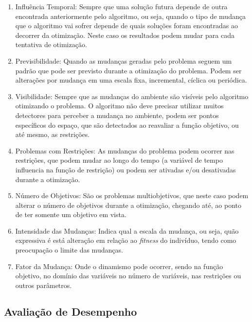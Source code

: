 \begin{enumerate}
	\item Influência Temporal: Sempre que uma solução futura depende de outra encontrada anteriormente pelo algoritmo, ou seja, quando o tipo de mudança que o algoritmo vai sofrer depende de quais soluções foram encontradas ao decorrer da otimização. Neste caso os resultados podem mudar para cada tentativa de otimização.
	
	\item Previsibilidade: Quando as mudanças geradas pelo problema seguem um padrão que pode ser previsto durante a otimização do problema. Podem ser alterações por mudança em uma escala fixa, incremental, cíclica ou periódica.
	
	\item Visibilidade: Sempre que as mudanças do ambiente são visíveis pelo algoritmo otimizando o problema. O algoritmo não deve precisar utilizar muitos detectores para perceber a mudança no ambiente, podem ser pontos específicos do espaço, que são detectados ao reavaliar a função objetivo, ou até mesmo, as restrições.
	
	\item Problemas com Restrições: As mudanças do problema podem ocorrer nas restrições, que podem mudar ao longo do tempo (a variável de tempo influencia na função de restrição) ou podem ser ativadas e/ou desativadas durante a otimização.
	
	\item Número de Objetivos: São os problemas multiobjetivos, que neste caso podem alterar o número de objetivos durante a otimização, chegando até, ao ponto de ter somente um objetivo em vista.
	
	\item Intensidade das Mudanças: Indica qual a escala da mudança, ou seja, quão expressiva é está alteração em relação ao \textit{fitness} do indivíduo, tendo como preocupação o limite das mudanças.
	
	\item Fator da Mudança: Onde o dinamismo pode ocorrer, sendo na função objetivo, no domínio das variáveis no número de variáveis, nas restrições ou outros parâmetros.  
\end{enumerate}

\subsection{Avaliação de Desempenho}
\label{sec:perfermance_measures}


